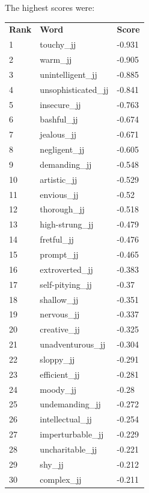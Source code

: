 \documentclass[10pt,letterpaper]{book}
\begin{document}
The highest scores were:
\begin{tabular}{ l l l }
        \textbf{Rank} & \textbf{Word} & \textbf{Score} \\
        1 & touchy\_jj & -0.931 \\
        2 & warm\_jj & -0.905 \\
        3 & unintelligent\_jj & -0.885 \\
        4 & unsophisticated\_jj & -0.841 \\
        5 & insecure\_jj & -0.763 \\
        6 & bashful\_jj & -0.674 \\
        7 & jealous\_jj & -0.671 \\
        8 & negligent\_jj & -0.605 \\
        9 & demanding\_jj & -0.548 \\
        10 & artistic\_jj & -0.529 \\
        11 & envious\_jj & -0.52 \\
        12 & thorough\_jj & -0.518 \\
        13 & high-strung\_jj & -0.479 \\
        14 & fretful\_jj & -0.476 \\
        15 & prompt\_jj & -0.465 \\
        16 & extroverted\_jj & -0.383 \\
        17 & self-pitying\_jj & -0.37 \\
        18 & shallow\_jj & -0.351 \\
        19 & nervous\_jj & -0.337 \\
        20 & creative\_jj & -0.325 \\
        21 & unadventurous\_jj & -0.304 \\
        22 & sloppy\_jj & -0.291 \\
        23 & efficient\_jj & -0.281 \\
        24 & moody\_jj & -0.28 \\
        25 & undemanding\_jj & -0.272 \\
        26 & intellectual\_jj & -0.254 \\
        27 & imperturbable\_jj & -0.229 \\
        28 & uncharitable\_jj & -0.221 \\
        29 & shy\_jj & -0.212 \\
        30 & complex\_jj & -0.211 \\
\end{tabular}
\end{document}
